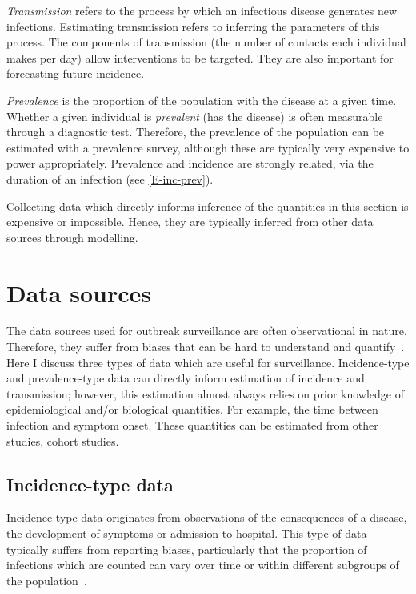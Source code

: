 \documentclass[thesis.tex]{subfiles}
\begin{document}
\emph{Transmission} refers to the process by which an infectious disease generates new infections.
Estimating transmission refers to inferring the parameters of this process.
The components of transmission (\eg the number of contacts each individual makes per day) allow interventions to be targeted.
They are also important for forecasting future incidence.

\emph{Prevalence} is the proportion of the population with the disease at a given time.
Whether a given individual is \emph{prevalent} (has the disease) is often measurable through a diagnostic test.
Therefore, the prevalence of the population can be estimated with a prevalence survey, although these are typically very expensive to power appropriately.
Prevalence and incidence are strongly related, via the duration of an infection (see \cref{E-inc-prev}).


Collecting data which directly informs inference of the quantities in this section is expensive or impossible.
Hence, they are typically inferred from other data sources through modelling.

\section{Data sources}

The data sources used for outbreak surveillance are often observational in nature.
Therefore, they suffer from biases that can be hard to understand and quantify~\autocite{shadboltChallenges}.
Here I discuss three types of data which are useful for surveillance.
Incidence-type and prevalence-type data can directly inform estimation of incidence and transmission; however, this estimation almost always relies on prior knowledge of epidemiological and/or biological quantities.
For example, the time between infection and symptom onset.
These quantities can be estimated from other studies, \eg cohort studies.

\subsection{Incidence-type data}

Incidence-type data originates from observations of the consequences of a disease, \eg the development of symptoms or admission to hospital.
This type of data typically suffers from reporting biases, particularly that the proportion of infections which are counted can vary over time or within different subgroups of the population~\autocites[chapter 9]{lashModern}{shadboltChallenges}.
\end{document}

